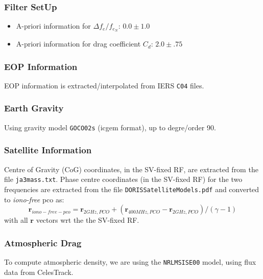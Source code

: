 \subsubsection{Filter SetUp}
\begin{itemize}
  \item A-priori information for $\Delta f_e / f_{e_N}$: $0.0 \pm 1.0$
  \item A-priori information for drag coefficient $C_{d}$: $2.0 \pm .75$
\end{itemize}

\subsubsection{EOP Information}
EOP information is extracted/interpolated from IERS \texttt{C04} files.

\subsubsection{Earth Gravity}
Using gravity model \texttt{GOCO02s} (icgem format), up to degre/order 90.


\subsubsection{Satellite Information}
Centre of Gravity (CoG) coordinates, in the SV-fixed RF, are extracted from the 
file \texttt{ja3mass.txt}. Phase centre coordinates (in the SV-fixed RF) for the 
two frequencies are extracted from the file \texttt{DORISSatelliteModels.pdf} and 
converted to \emph{iono-free} pco as:
\begin{equation}
  \bm{r}_{iono-free-pco} = \bm{r}_{2GHz,PCO} + (\bm{r}_{400MHz,PCO} - \bm{r}_{2GHz,PCO}) / (\gamma - 1)
\end{equation}
with all $\bm{r}$ vectors wrt the the SV-fixed RF.

\subsubsection{Atmospheric Drag}
To compute atmospheric density, we are using the \texttt{NRLMSISE00} model, 
using flux data from CelesTrack.

